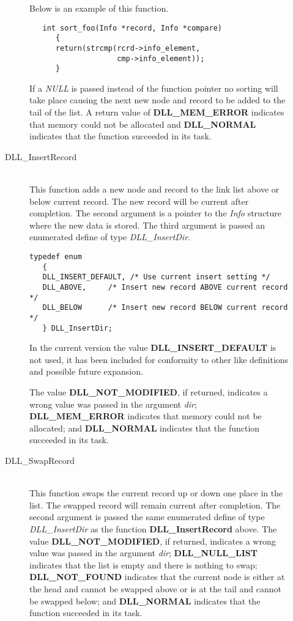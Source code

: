 \documentclass[10pt,letterpaper,titlepage]{article}
\begin{document}
\begin{description}
\begin{description}
 Below is an example of this function.

\begin{verbatim}
   int sort_foo(Info *record, Info *compare)
      {
      return(strcmp(rcrd->info_element,
                    cmp->info_element));
      }

\end{verbatim}
 
 If a \emph{NULL} is passed instead of the function pointer no sorting will take place causing the next new node and record to be added to the tail of the list.  A return value of \textbf{DLL\_MEM\_ERROR} indicates that memory could not be allocated and \textbf{DLL\_NORMAL} indicates that the function succeeded in its task.

 \item[DLL\_InsertRecord]\quad\\
 This function adds a new node and record to the link list above or below current record.  The new record will be current after completion.  The second argument is a pointer to the \emph{Info} structure where the new data is stored.  The third argument is passed an enumerated define of type \emph{DLL\_InsertDir}.  

 \small
 \begin{verbatim}
typedef enum
   {
   DLL_INSERT_DEFAULT, /* Use current insert setting */
   DLL_ABOVE,     /* Insert new record ABOVE current record */
   DLL_BELOW      /* Insert new record BELOW current record */ 
   } DLL_InsertDir;
\end{verbatim}
 \normalsize

 In the current version the value \textbf{DLL\_INSERT\_DEFAULT} is not used, it has been included for conformity to other like definitions and possible future expansion.
\vspace{8pt}

\noindent
 The value \textbf{DLL\_NOT\_MODIFIED}, if returned, indicates a wrong value was passed in the argument \emph{dir}; \textbf{DLL\_MEM\_ERROR} indicates that memory could not be allocated; and \textbf{DLL\_NORMAL} indicates that the function succeeded in its task.

 \item[DLL\_SwapRecord]\quad\\
 This function swaps the current record up or down one place in the list.  The swapped record will remain current after completion.  The second argument is passed the same enumerated define of type \emph{DLL\_InsertDir} as the function \textbf{DLL\_InsertRecord} above.  The value \textbf{DLL\_NOT\_MODIFIED}, if returned, indicates a wrong value was passed in the argument \emph{dir}; \textbf{DLL\_NULL\_LIST} indicates that the list is empty and there is nothing to swap; \textbf{DLL\_NOT\_FOUND} indicates that the current node is either at the head and cannot be swapped above or is at the tail and cannot be swapped below; and \textbf{DLL\_NORMAL} indicates that the function succeeded in its task.


\end{description}
\end{description}
\end{document}
